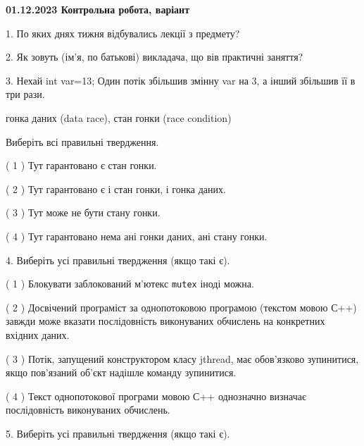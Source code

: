 \documentclass[12pt, ukrainian]{article}
\def\code#1{\Verb!#1!}
\begin{document}
\vspace{4mm}
\newpage
\begin {large}

\textbf{01.12.2023 Контрольна робота, варіант  }\par


{
1. По яких днях тижня відбувались лекції з предмету?



\vspace{5mm}
2. Як зовуть (ім'я, по батькові) викладача, що вів практичні заняття?



\vspace{5mm}
3. Нехай int var=13; Один потік збільшив змінну var на 3, а інший збільшив її в три рази.

гонка даних (data race), стан гонки (race condition)

Виберіть всі правильні твердження.\par
\vspace{2mm}
( 1 ) Тут гарантовано є стан гонки.%

( 2 ) Тут гарантовано є і стан гонки, і гонка даних.%

( 3 ) Тут може не бути стану гонки.%

( 4 ) Тут гарантовано нема ані гонки даних, ані стану гонки.%


\vspace{5mm}
4. Виберіть усі правильні твердження (якщо такі є).\par
\vspace{2mm}

( 1 ) Блокувати заблокований м’ютекс  \code{mutex} іноді можна.%

( 2 ) Досвічений програміст за однопотоковою програмою (текстом мовою С++) завжди може вказати послідовність виконуваних обчислень на конкретних вхідних даних.%

( 3 ) Потік, запущений конструктором класу jthread, має обов’язково зупинитися, якщо пов’язаний об’єкт надішле команду зупинитися.%

( 4 ) Текст однопотокової програми мовою С++ однозначно визначає послідовність виконуваних обчислень.%


\vspace{5mm}
5. Виберіть усі правильні твердження (якщо такі є).\par
\vspace{2mm}

}
\end{large}
\end{document}
